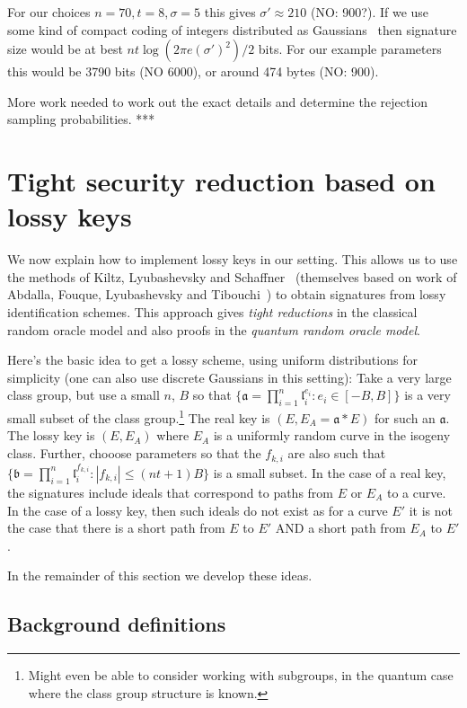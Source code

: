 \documentclass{llncs}
\renewcommand{\a}{\mathfrak{a}}
\renewcommand{\b}{\mathfrak{b}}
\renewcommand{\l}{\mathfrak{l}}
\begin{document}
\begin{enumerate}
For our choices $n=70, t = 8, \sigma = 5$ this gives $\sigma' \approx 210$ (NO: 900?).
If we use some kind of compact coding of integers distributed as Gaussians~\cite{DDLL13} then signature size would be at best $nt \log( 2 \pi e (\sigma')^2 )/2$ bits.
For our example parameters this would be 3790 bits (NO 6000), or around 474 bytes (NO: 900).

More work needed to work out the exact details and determine the rejection sampling probabilities. ***

\end{enumerate}


\section{Tight security reduction based on lossy keys}\label{sec:lossy-keys}


We now explain how to implement lossy keys in our setting.
This allows us to use the methods of Kiltz, Lyubashevsky and Schaffner~\cite{KLS18} (themselves based on work of Abdalla, Fouque, Lyubashevsky and Tibouchi~\cite{AFLT12}) to obtain signatures from lossy identification schemes. This approach gives \emph{tight reductions} in the classical random oracle model and also proofs in the \emph{quantum random oracle model}.


Here's the basic idea to get a lossy scheme, using uniform distributions for simplicity (one can also use discrete Gaussians in this setting):
Take a very large class group, but use a small $n$, $B$ so that $\{ \a = \prod_{i=1}^n \l_i^{e_i} : e_i \in [-B,B] \}$ is a very small subset of the class group.\footnote{Might even be able to consider working with subgroups, in the quantum case where the class group structure is known.}
The real key is $(E, E_A = \a*E )$ for such an $\a$.
The lossy key is $(E, E_A )$ where $E_A$ is a uniformly random curve in the isogeny class.
Further, chooose parameters so that the $f_{k,i}$ are also such that $\{ \b = \prod_{i=1}^n \l_i^{f_{k,i}} : |f_{k,i}| \le (nt+1)B \}$ is a small subset.
In the case of a real key, the signatures include ideals that correspond to paths from $E$ or $E_A$ to a  curve.
In the case of a lossy key, then such ideals do not exist as for a curve $E'$ it is not the case that there is a short path from $E$ to $E'$ AND a short path from $E_A$ to $E'$.

In the remainder of this section we develop these ideas.


\subsection{Background definitions} \label{sec:KLS-defns}
\end{document}
